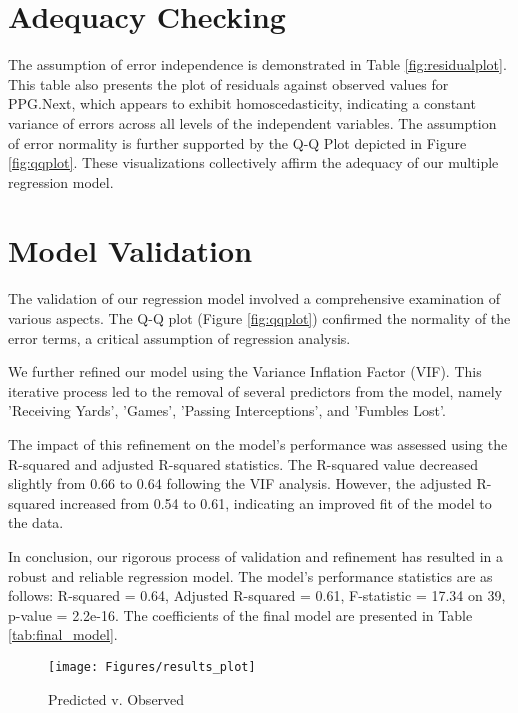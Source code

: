 \section{Adequacy Checking}

The assumption of error independence is demonstrated in Table \ref{fig:residualplot}. This table also presents the plot of residuals against observed values for PPG.Next, which appears to exhibit homoscedasticity, indicating a constant variance of errors across all levels of the independent variables. The assumption of error normality is further supported by the Q-Q Plot depicted in Figure \ref{fig:qqplot}. These visualizations collectively affirm the adequacy of our multiple regression model.


\section{Model Validation}

The validation of our regression model involved a comprehensive examination of various aspects. The Q-Q plot (Figure \ref{fig:qqplot}) confirmed the normality of the error terms, a critical assumption of regression analysis.

We further refined our model using the Variance Inflation Factor (VIF). This iterative process led to the removal of several predictors from the model, namely 'Receiving Yards', 'Games', 'Passing Interceptions', and 'Fumbles Lost'.

The impact of this refinement on the model's performance was assessed using the R-squared and adjusted R-squared statistics. The R-squared value decreased slightly from 0.66 to 0.64 following the VIF analysis. However, the adjusted R-squared increased from 0.54 to 0.61, indicating an improved fit of the model to the data.

In conclusion, our rigorous process of validation and refinement has resulted in a robust and reliable regression model. The model's performance statistics are as follows: R-squared = 0.64, Adjusted R-squared = 0.61, F-statistic = 17.34 on 39, p-value = 2.2e-16. The coefficients of the final model are presented in Table \ref{tab:final_model}.

\begin{figure}[h]
	\centering
	\texttt{[image: Figures/results\_plot]}
	\caption{Predicted v. Observed}
	\label{fig:resultsplot}
\end{figure}






